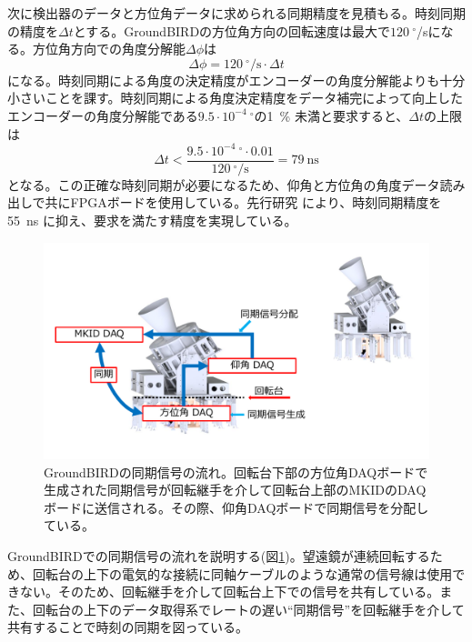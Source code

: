 次に検出器のデータと方位角データに求められる同期精度を見積もる。時刻同期の精度を$\Delta t$とする。GroundBIRDの方位角方向の回転速度は最大で$\SI{120}{^{\circ}}$/sになる。方位角方向での角度分解能$\Delta\phi$は
\begin{equation}
  \Delta\phi = \SI{120}{^{\circ}}/\mathrm{s} \cdot \Delta t
\end{equation}
になる。時刻同期による角度の決定精度がエンコーダーの角度分解能よりも十分小さいことを課す。時刻同期による角度決定精度をデータ補完によって向上したエンコーダーの角度分解能である$9.5\cdot {10^{-4}}~^{\circ}$の\SI{1}{\%} 未満と要求すると、$\Delta t$の上限は
\begin{equation}
  \Delta t < \frac{9.5\cdot {10^{-4}}~^{\circ}\cdot 0.01}{\SI{120}{^{\circ}}/\mathrm{s}} = \SI{79}{\mathrm{ns}}
\end{equation}
となる。この正確な時刻同期が必要になるため、仰角と方位角の角度データ読み出しで共にFPGAボードを使用している。先行研究 \cite{ikemitsu}により、時刻同期精度を\SI{55}{ns} に抑え、要求を満たす精度を実現している。

\begin{figure}[htbp]
  \centering
  \includegraphics[width=0.9\columnwidth]{4_elDAQ/figs/GB_sync_2.pdf}
  \caption{GroundBIRDの同期信号の流れ。回転台下部の方位角DAQボードで生成された同期信号が回転継手を介して回転台上部のMKIDのDAQボードに送信される。その際、仰角DAQボードで同期信号を分配している。}
  \label{GB_sync}
\end{figure}

GroundBIRDでの同期信号の流れを説明する(図\ref{GB_sync})。望遠鏡が連続回転するため、回転台の上下の電気的な接続に同軸ケーブルのような通常の信号線は使用できない。そのため、回転継手を介して回転台上下での信号を共有している。また、回転台の上下のデータ取得系でレートの遅い``同期信号''を回転継手を介して共有することで時刻の同期を図っている。

